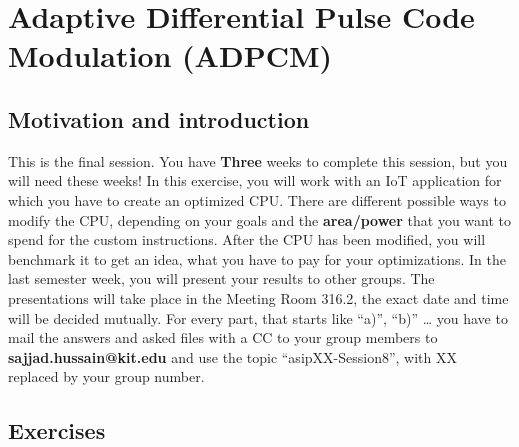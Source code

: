 
\hypertarget{adaptive-differential-pulse-code-modulation-adpcm}{%
\chapter*{Adaptive Differential Pulse Code Modulation (ADPCM)}\label{adaptive-differential-pulse-code-modulation-adpcm}}


\section*{Motivation and introduction}

This is the final session. You have \textbf{{Three}} weeks to complete
this session, but you will need these weeks! In this exercise, you will
work with an IoT application for which you have to create an optimized
CPU. There are different possible ways to modify the CPU, depending on
your goals and the \textbf{{area/power}} that you want to spend for the
custom instructions. After the CPU has been modified, you will benchmark
it to get an idea, what you have to pay for your optimizations. In the
last semester week, you will present your results to other groups. The
presentations will take place in the Meeting Room 316.2, the exact date
and time will be decided mutually. For every part, that starts like
``a)'', ``b)'' \ldots{} you have to mail the answers and asked files
with a CC to your group members to \textbf{sajjad.hussain@kit.edu} and
use the topic ``asipXX-Session8'', with XX replaced by your group
number.

\section*{Exercises}

